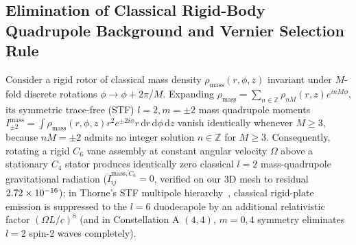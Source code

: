 \documentclass[aps,prd,twocolumn,10pt,showkeys,nofootinbib,floatfix,longbibliography]{revtex4-2}
\newcommand{\dd}{\mathrm{d}}
\begin{document}
\subsection{Elimination of Classical Rigid-Body Quadrupole Background and Vernier Selection Rule}
Consider a rigid rotor of classical mass density $\rho_{\mathrm{mass}}(r, \phi, z)$ invariant under $M$-fold discrete rotations $\phi \to \phi + 2\pi/M$. Expanding $\rho_{\mathrm{mass}} = \sum_{n\in\mathbb{Z}} \rho_{nM}(r,z)e^{inM\phi}$, its symmetric trace-free (STF) $l=2, m=\pm 2$ mass quadrupole moments~\cite{thorne1980rmp} $I_{\pm 2}^{\mathrm{mass}} = \int \rho_{\mathrm{mass}}(r,\phi,z) r^2 e^{\pm 2i\phi} r\,\dd r\,\dd\phi\,\dd z$ vanish identically whenever $M \ge 3$, because $nM = \pm 2$ admits no integer solution $n \in \mathbb{Z}$ for $M \ge 3$. Consequently, rotating a rigid $C_6$ vane assembly at constant angular velocity $\Omega$ above a stationary $C_4$ stator produces identically zero classical $l=2$ mass-quadrupole gravitational radiation ($\dddot{I}_{ij}^{\mathrm{mass},C_6} = 0$, verified on our 3D mesh to residual $2.72\times 10^{-16}$); in Thorne's STF multipole hierarchy~\cite{thorne1980rmp}, classical rigid-plate emission is suppressed to the $l=6$ duodecapole by an additional relativistic factor $(\Omega L/c)^8$ (and in Constellation A $(4,4)$, $m=0,4$ symmetry eliminates $l=2$ spin-2 waves completely).
\end{document}
